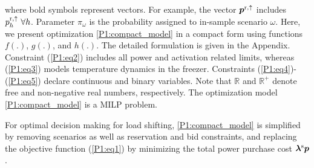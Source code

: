 %
where bold symbols represent vectors. For example, the vector $\bm{p}^{\rm{r},\uparrow}$ includes $p_{h}^{\rm{r},\uparrow} \ \forall{h}$. Parameter $\pi_{\omega}$ is the probability assigned to in-sample scenario $\omega$. Here, we present optimization \eqref{P1:compact_model} in a compact form using functions $f(.)$, $g(.)$, and $h(.)$. The detailed formulation is given in the Appendix. Constraint (\ref{P1:eq2}) includes all power and activation related limits, whereas (\ref{P1:eq3}) models temperature dynamics in the freezer. Constraints (\ref{P1:eq4})-(\ref{P1:eq5}) declare continuous and binary variables. Note that $\mathbb{R}$ and $\mathbb{R}^{+}$ denote free and non-negative real numbers, respectively. The optimization model \eqref{P1:compact_model} is a MILP problem.


For optimal decision making for load shifting, \eqref{P1:compact_model} is simplified by removing scenarios as well as reservation and bid constraints, and replacing the objective function (\ref{P1:eq1}) by minimizing the total power purchase cost $\bm{\lambda}^{\rm{s}} \bm{p}$.

\vspace{-1mm}
